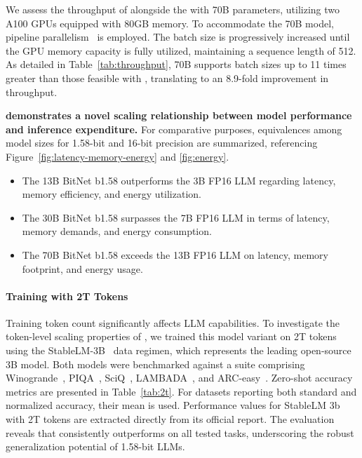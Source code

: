 We assess the throughput of  alongside the  with 70B parameters, utilizing two A100 GPUs equipped with 80GB memory. To accommodate the  70B model, pipeline parallelism~\cite{gpipe} is employed. The batch size is progressively increased until the GPU memory capacity is fully utilized, maintaining a sequence length of 512. As detailed in Table~\ref{tab:throughput},  70B supports batch sizes up to 11 times greater than those feasible with , translating to an 8.9-fold improvement in throughput.

\textbf{ demonstrates a novel scaling relationship between model performance and inference expenditure.} For comparative purposes, equivalences among model sizes for 1.58-bit and 16-bit precision are summarized, referencing Figure~\ref{fig:latency-memory-energy} and \ref{fig:energy}.

\begin{itemize}
    \item The 13B BitNet b1.58 outperforms the 3B FP16 LLM regarding latency, memory efficiency, and energy utilization.
    \item The 30B BitNet b1.58 surpasses the 7B FP16 LLM in terms of latency, memory demands, and energy consumption.
    \item The 70B BitNet b1.58 exceeds the 13B FP16 LLM on latency, memory footprint, and energy usage.
\end{itemize}

\paragraph{Training with 2T Tokens}

Training token count significantly affects LLM capabilities. To investigate the token-level scaling properties of , we trained this model variant on 2T tokens using the StableLM-3B~\cite{StableLM-3B-4E1T} data regimen, which represents the leading open-source 3B model. Both models were benchmarked against a suite comprising Winogrande~\cite{winoGrande}, PIQA~\cite{piqa}, SciQ~\cite{sciq}, LAMBADA~\cite{lambada}, and ARC-easy~\cite{arc}. Zero-shot accuracy metrics are presented in Table~\ref{tab:2t}. For datasets reporting both standard and normalized accuracy, their mean is used. Performance values for StableLM 3b with 2T tokens are extracted directly from its official report. The evaluation reveals that  consistently outperforms on all tested tasks, underscoring the robust generalization potential of 1.58-bit LLMs.

